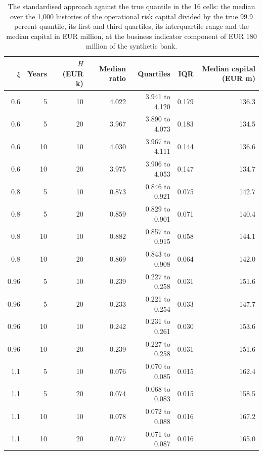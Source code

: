 \begin{table}[htbp]
\centering\small
\caption{The standardised approach against the true quantile in the 16 cells: the median over the 1{,}000 histories of the operational risk capital divided by the true 99.9 percent quantile, its first and third quartiles, its interquartile range and the median capital in EUR million, at the business indicator component of EUR 180 million of the synthetic bank.}
\label{tab:sma}
\begin{tabular}{rrrrrrr}
\toprule
$\xi$ & Years & $H$ (EUR k) & Median ratio & Quartiles & IQR & Median capital (EUR m) \\
\midrule
0.6 & 5 & 10 & 4.022 & 3.941 to 4.120 & 0.179 & 136.3 \\
0.6 & 5 & 20 & 3.967 & 3.890 to 4.073 & 0.183 & 134.5 \\
0.6 & 10 & 10 & 4.030 & 3.967 to 4.111 & 0.144 & 136.6 \\
0.6 & 10 & 20 & 3.975 & 3.906 to 4.053 & 0.147 & 134.7 \\
\midrule
0.8 & 5 & 10 & 0.873 & 0.846 to 0.921 & 0.075 & 142.7 \\
0.8 & 5 & 20 & 0.859 & 0.829 to 0.901 & 0.071 & 140.4 \\
0.8 & 10 & 10 & 0.882 & 0.857 to 0.915 & 0.058 & 144.1 \\
0.8 & 10 & 20 & 0.869 & 0.843 to 0.908 & 0.064 & 142.0 \\
\midrule
0.96 & 5 & 10 & 0.239 & 0.227 to 0.258 & 0.031 & 151.6 \\
0.96 & 5 & 20 & 0.233 & 0.221 to 0.254 & 0.033 & 147.7 \\
0.96 & 10 & 10 & 0.242 & 0.231 to 0.261 & 0.030 & 153.6 \\
0.96 & 10 & 20 & 0.239 & 0.227 to 0.258 & 0.031 & 151.6 \\
\midrule
1.1 & 5 & 10 & 0.076 & 0.070 to 0.085 & 0.015 & 162.4 \\
1.1 & 5 & 20 & 0.074 & 0.068 to 0.083 & 0.015 & 158.5 \\
1.1 & 10 & 10 & 0.078 & 0.072 to 0.088 & 0.016 & 167.2 \\
1.1 & 10 & 20 & 0.077 & 0.071 to 0.087 & 0.016 & 165.0 \\
\bottomrule
\end{tabular}
\end{table}
